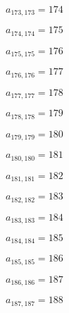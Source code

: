 \documentclass[a4paper,12pt]{article}
\begin{document}
$a _{ 173, 173 } = 174$

$a _{ 174, 174 } = 175$

$a _{ 175, 175 } = 176$

$a _{ 176, 176 } = 177$

$a _{ 177, 177 } = 178$

$a _{ 178, 178 } = 179$

$a _{ 179, 179 } = 180$

$a _{ 180, 180 } = 181$

$a _{ 181, 181 } = 182$

$a _{ 182, 182 } = 183$

$a _{ 183, 183 } = 184$

$a _{ 184, 184 } = 185$

$a _{ 185, 185 } = 186$

$a _{ 186, 186 } = 187$

$a _{ 187, 187 } = 188$
\end{document}
